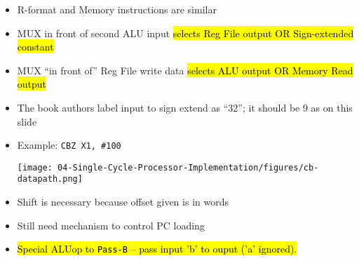 \begin{frame}[fragile]

  \begin{itemize}
  \item R-format and Memory instructions are similar
  \item MUX in front of second ALU input \hl{selects Reg File output OR Sign-extended constant}
  \item MUX ``in front of'' Reg File write data \hl{selects ALU output OR Memory Read output}
    \end{itemize}
  \BNotes\ifnum{}
  \begin{itemize}
  \item The book authors label input to sign extend as ``32''; it should be 9
    as on this slide
    \end{itemize}
\fi\ENotes
\end{frame}

\begin{frame}[fragile]
\begin{itemize}
\item Example: {\tt CBZ X1, \#100}

\texttt{[image: 04-Single-Cycle-Processor-Implementation/figures/cb-datapath.png]}
\item Shift is necessary because offset given is in words
\item Still need mechanism to control PC loading
\item \hl{Special ALUop to \texttt{Pass-B} -- pass input 'b' to ouput ('a' ignored).}
\end{itemize}
\BNotes\ifnum{}
\fi\ENotes
\end{frame}

